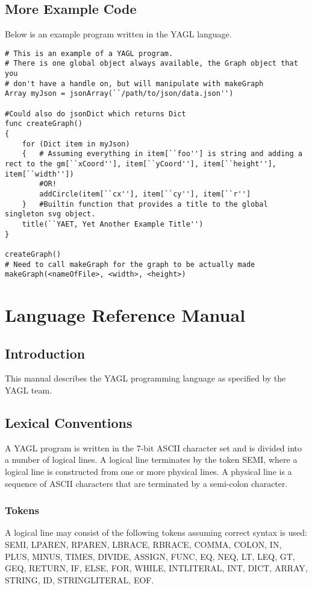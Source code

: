 \documentclass[12pt]{article}
\begin{document}
\subsection{More Example Code}
Below is an example program written in the YAGL language.

\begin{lstlisting}
# This is an example of a YAGL program. 
# There is one global object always available, the Graph object that you 
# don't have a handle on, but will manipulate with makeGraph
Array myJson = jsonArray(``/path/to/json/data.json'')

#Could also do jsonDict which returns Dict 
func createGraph()
{
    for (Dict item in myJson)
    {   # Assuming everything in item[``foo''] is string and adding a rect to the gm[``xCoord''], item[``yCoord''], item[``height''], item[``width''])
        #OR!
        addCircle(item[``cx''], item[``cy''], item[``r'']
    }   #Builtin function that provides a title to the global singleton svg object. 
    title(``YAET, Yet Another Example Title'')
}

createGraph()
# Need to call makeGraph for the graph to be actually made
makeGraph(<nameOfFile>, <width>, <height>)

\end{lstlisting}

\section{Language Reference Manual}

\subsection{Introduction}
This manual describes the YAGL programming language as specified by the YAGL team. 

\subsection{Lexical Conventions}
A YAGL program is written in the 7-bit ASCII character set and is divided into a number of logical lines. A logical line terminates by the token SEMI, where a logical line is constructed from one or more physical lines. A physical line is a sequence of ASCII characters that are terminated by a semi-colon character.

\subsubsection{Tokens}
A logical line may consist of the following tokens assuming correct syntax is used: \\
SEMI, LPAREN, RPAREN, LBRACE, RBRACE, COMMA, COLON, IN, PLUS, MINUS, TIMES, DIVIDE, ASSIGN, FUNC, EQ, NEQ, LT, LEQ, GT, GEQ, RETURN, IF, ELSE, FOR, WHILE, INTLITERAL, INT, DICT, ARRAY, STRING, ID, STRINGLITERAL, EOF.
\end{document}
